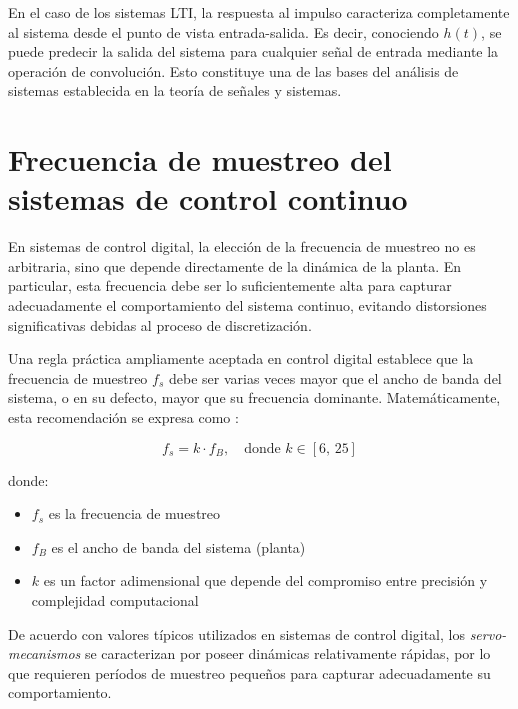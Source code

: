 \documentclass[letter,12pt]{article}
\begin{document}
\par En el caso de los sistemas LTI, la respuesta al impulso caracteriza completamente al sistema desde el punto de vista entrada-salida. Es decir, 
conociendo $h(t)$, se puede predecir la salida del sistema para cualquier señal de entrada 
mediante la operación de convolución. Esto constituye una de las bases del análisis de sistemas 
establecida en la teoría de señales y sistemas.\cite{oppenheim1997signals}



\section{Frecuencia de muestreo del sistemas de control continuo}

En sistemas de control digital, la elección de la frecuencia de muestreo no es arbitraria, sino que depende directamente de la dinámica de la planta. En particular, esta frecuencia debe ser lo suficientemente alta para capturar adecuadamente el comportamiento del sistema continuo, evitando distorsiones significativas debidas al proceso de discretización.

Una regla práctica ampliamente aceptada en control digital establece que la frecuencia de muestreo $f_s$ debe ser varias veces mayor que el ancho de banda del sistema, o en su defecto, mayor que su frecuencia dominante. Matemáticamente, esta recomendación se expresa como \cite{LandauDigitalControl}:

\begin{equation}
	f_s = k \cdot f_{B}, \quad \text{donde } k \in [6,\,25]
\end{equation}

donde:
\begin{itemize}
	\item $f_s$ es la frecuencia de muestreo
	
	\item $f_{B}$ es el ancho de banda del sistema (planta)
	
	\item $k$ es un factor adimensional que depende del compromiso entre precisión y complejidad computacional
\end{itemize}

De acuerdo con valores típicos utilizados en sistemas de control digital, los \textit{servo-mecanismos} se caracterizan por poseer dinámicas relativamente rápidas, por lo que requieren períodos de muestreo pequeños para capturar adecuadamente su comportamiento. 
\end{document}
